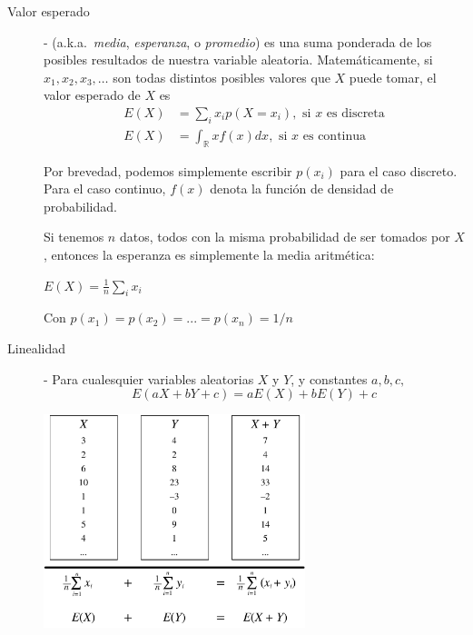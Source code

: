 \documentclass[12pt]{scrartcl}
\theoremstyle{definition}
\begin{document}
\begin{description}
	\item[Valor esperado] - (a.k.a.~\emph{media}, \emph{esperanza}, o \emph{promedio}) es una suma ponderada de los posibles resultados de nuestra variable aleatoria. Matemáticamente, si $x_1, x_2, x_3, \dots$ son todas distintos posibles valores que $X$ puede tomar, el valor esperado de $X$ es
	\begin{align*}
		E(X) &= \sum\limits_{i}x_i p(X=x_i), \text{ si $x$ es discreta}\\
		E(X) &= \int_\mathbb{R} xf(x)dx, \text{ si $x$ es continua}
	\end{align*}
	
	Por brevedad, podemos simplemente escribir $p(x_i)$ para el caso discreto. Para el caso continuo, $f(x)$ denota la función de densidad de probabilidad.
	
	Si tenemos $n$ datos, todos con la misma probabilidad de ser tomados por $X$, entonces la esperanza es simplemente la media aritmética:
	
	\begin{center}
		$E(X) = \frac{1}{n}\sum\limits_{i}x_i$
	\end{center}
	
	Con $p(x_1)=p(x_2)=...=p(x_n)=1/n$

	\item[Linealidad] - Para cualesquier variables aleatorias $X$ y $Y$, y constantes $a,b,c,$ 
	\[E(aX + bY + c) = aE(X) + bE(Y) + c \]
	
	\begin{minipage}{\linewidth}
		\centering
		\includegraphics[width=3in]{figs/linearity.pdf}
	\end{minipage}
	
	
	

\end{description}
\end{document}
